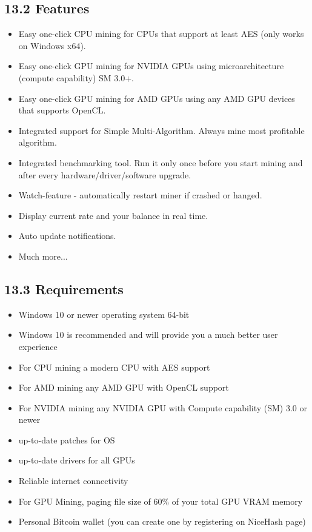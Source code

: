 \subsection*{13.2 Features}
\begin{itemize}
	\item Easy one-click CPU mining for CPUs that support at least AES (only works on Windows x64).
	\item Easy one-click GPU mining for NVIDIA GPUs using microarchitecture (compute capability) SM 3.0+.
	\item Easy one-click GPU mining for AMD GPUs using any AMD GPU devices that supports OpenCL.
	\item Integrated support for Simple Multi-Algorithm. Always mine most profitable algorithm.
	\item Integrated benchmarking tool. Run it only once before you start mining and after every hardware/driver/software upgrade.
	\item Watch-feature - automatically restart miner if crashed or hanged.
	\item Display current rate and your balance in real time.
	\item Auto update notifications.
	\item Much more...
\end{itemize}

\subsection*{13.3 Requirements}
\begin{itemize}
	\item Windows 10 or newer operating system 64-bit
	\item Windows 10 is recommended and will provide you a much better user experience
	\item For CPU mining a modern CPU with AES support
	\item For AMD mining any AMD GPU with OpenCL support
	\item For NVIDIA mining any NVIDIA GPU with Compute capability (SM) 3.0 or newer
	\item up-to-date patches for OS
	\item up-to-date drivers for all GPUs
	\item Reliable internet connectivity
	\item For GPU Mining, paging file size of 60\% of your total GPU VRAM memory
	\item Personal Bitcoin wallet (you can create one by registering on NiceHash page)
\end{itemize}

